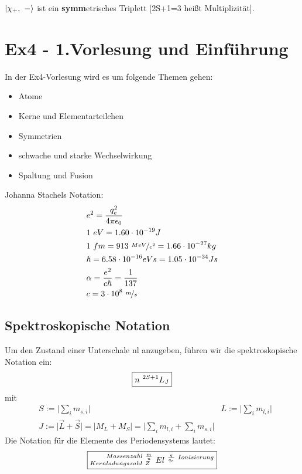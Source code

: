 \documentclass[Ex4_Zusammenfassung.tex]{subfiles}
\begin{document}
$\ket{\chi_+,\ -}$ ist ein \textbf{symm}etrisches Triplett [2S+1=3 heißt Multiplizität].

\chapter{ Ex4 - 1.Vorlesung und Einführung}

In der Ex4-Vorlesung wird es um folgende Themen gehen:

\begin{itemize}
\item Atome
\item Kerne und Elementarteilchen
\item Symmetrien
\item schwache und starke Wechselwirkung
\item Spaltung und Fusion 
\end{itemize}
Johanna Stachels Notation: 
\begin{align*}
& e^2 = \frac{q_e^2}{4\pi \epsilon_{0}}  \\
& 1 \ eV = 1.60 \cdot 10^{-19} J  \\
& 1 \ fm = 913 \ \nicefrac{MeV}{c^2} = 1.66 \cdot 10^{-27} kg \\
& \hslash = 6.58 \cdot 10^{-16} eVs = 1.05 \cdot 10^{-34} Js \\
&\alpha = \frac {e^2}{c \hslash} = \frac{1}{137} \\
&c = 3 \cdot 10^8 \  \nicefrac{m}{s} \\
\end{align*}

\section{Spektroskopische Notation}
Um den Zustand einer Unterschale nl anzugeben, führen wir die spektroskopische Notation ein: 
\begin{equation}
\centering \boxed{ n \ ^{2S+1}L_J }
\end{equation}
mit
\begin{align*}
&S := \lvert \sum_{i} m_{s,i} \rvert 
&L:=  \lvert \sum_{i} m_{l,i} \rvert \\
&J := \lvert \vec L + \vec S \rvert   = \lvert M_L + M_S \rvert   = \lvert \sum_{i} m_{l,i} + \sum_{i} m_{s,i}  \rvert 
\end{align*}
\newline
Die Notation für die Elemente des Periodensystems lautet: 
\begin{equation}
\centering \boxed{^{\qquad Massenzahl \  \frac{m}{u} } _{Kernladungszahl \  Z} \  El ^{\ \frac{q}{q_e} \  Ionisierung}} 
\end{equation}
\end{document}
